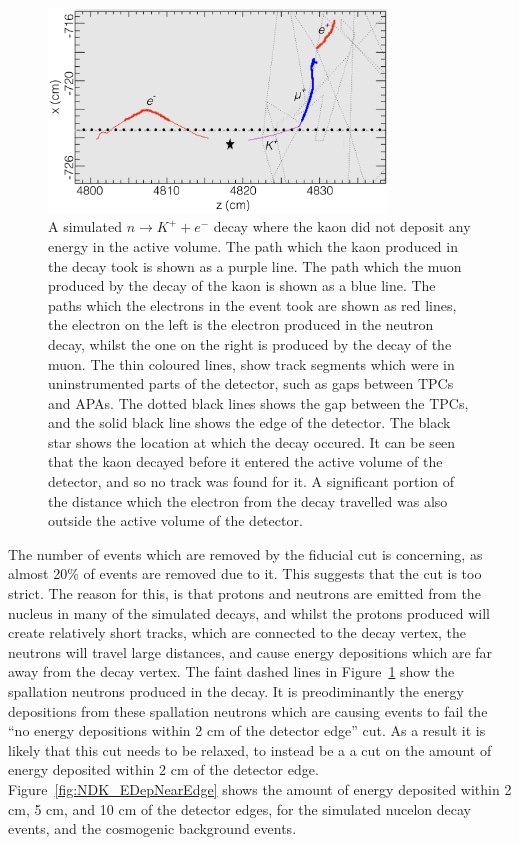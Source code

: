 \begin{figure}[h!]
  \centering
  \includegraphics[width=0.8\textwidth]{MissedKaon}
  \caption[A simulated $n \rightarrow K^{+} + e^{-}$ decay where the kaon did not deposit any energy in the active volume]
          {A simulated $n \rightarrow K^{+} + e^{-}$ decay where the kaon did not deposit any energy in the active volume. The path which the kaon produced in the decay took is shown as a purple line. The path which the muon produced by the decay of the kaon is shown as a blue line. The paths which the electrons in the event took are shown as red lines, the electron on the left is the electron produced in the neutron decay, whilst the one on the right is produced by the decay of the muon. The thin coloured lines, show track segments which were in uninstrumented parts of the detector, such as gaps between TPCs and APAs. The dotted black lines shows the gap between the TPCs, and the solid black line shows the edge of the detector. The black star shows the location at which the decay occured. It can be seen that the kaon decayed before it entered the active volume of the detector, and so no track was found for it. A significant portion of the distance which the electron from the decay travelled was also outside the active volume of the detector.}
  \label{fig:NDK_Sig_MissedKaon}
\end{figure}

The number of events which are removed by the fiducial cut is concerning, as almost 20\% of events are removed due to it. This suggests that the cut is too strict. The reason for this, is that protons and neutrons are emitted from the nucleus in many of the simulated decays, and whilst the protons produced will create relatively short tracks, which are connected to the decay vertex, the neutrons will travel large distances, and cause energy depositions which are far away from the decay vertex. The faint dashed lines in Figure~\ref{fig:NDK_Sig_MissedKaon} show the spallation neutrons produced in the decay. It is preodiminantly the energy depositions from these spallation neutrons which are causing events to fail the ``no energy depositions within 2 cm of the detector edge'' cut. As a result it is likely that this cut needs to be relaxed, to instead be a a cut on the amount of energy deposited within 2 cm of the detector edge. Figure~\ref{fig:NDK_EDepNearEdge} shows the amount of energy deposited within 2 cm, 5 cm, and 10 cm of the detector edges, for the simulated nucelon decay events, and the cosmogenic background events. \\ 


